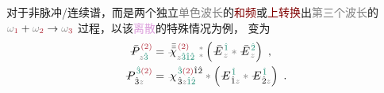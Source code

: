 对于\textcolor{NavyBlue}{非脉冲}/\textcolor{NavyBlue}{连续谱}，而是两个独立\textcolor{gray}{单色波长}的\textcolor{Maroon}{和频}或\textcolor{Maroon}{上转换}出\textcolor{gray}{第三个波长}的 $\mathcolor{gray}{\omega}_{\textcolor{Maroon}{1}} + \mathcolor{gray}{\omega}_{\textcolor{Maroon}{2}} \to \mathcolor{gray}{\omega}_{\textcolor{Maroon}{3}}$ 过程，以该\textcolor{Plum}{离散}的特殊情况为例， 变为
\begin{subequations} \label{eq:DP^(2)-plane_wave_basis-3_12}
\begin{align}
	\Xint{\mathcolor{gray}{-}}{30}{\bar{P}}^{\;\! \textcolor{Maroon}{(2)} }_{\;\! \mathcolor{gray}{z} \textcolor{PineGreen}{\hat{3}}} &= \Xint{{}^{}_{\mathcolor{gray}{-}}}{23}{\bar{\bar{\bar{\chi}}}}^{\;\!  \textcolor{Maroon}{(2)}}_{\mathcolor{gray}{z} \textcolor{PineGreen}{\hat{3} \hat{1} \hat{2}} } ~{}^{\mathcolor{gray}{*}}_{\mathcolor{gray}{*}} \left( \Xint{\mathcolor{gray}{-}}{295}{\bar{E}}^{\;\! \textcolor{PineGreen}{\hat{1}} }_{\;\! \mathcolor{gray}{z} } \mathcolor{gray}{*} \Xint{\mathcolor{gray}{-}}{295}{\bar{E}}^{\;\! \textcolor{PineGreen}{\hat{2}} }_{\;\! \mathcolor{gray}{z} } \right) ~, \label{eq:vec-DP^(2)-plane_wave_basis-3_12} \\
	\Xint{\mathcolor{gray}{-}}{30}{P}^{\;\! \textcolor{PineGreen}{\hat{3}} \textcolor{Maroon}{(2)} }_{\;\! \hat{3}\mathcolor{gray}{z}} &= \Xint{{}^{}_{\mathcolor{gray}{-}}}{23}{\chi}^{\;\! \textcolor{PineGreen}{\hat{3}} \textcolor{Maroon}{(2)} \hat{1} \hat{2} }_{\;\! \hat{3} \mathcolor{gray}{z} \textcolor{PineGreen}{\hat{1} \hat{2}}} \mathcolor{gray}{*} \left( \Xint{\mathcolor{gray}{-}}{295}{E}^{\;\!\textcolor{PineGreen}{\hat{1}}}_{\;\! \hat{1} \mathcolor{gray}{z}} \mathcolor{gray}{*} \Xint{\mathcolor{gray}{-}}{295}{E}^{\;\!\textcolor{PineGreen}{\hat{1}}}_{\;\! \hat{2} \mathcolor{gray}{z}} \right) ~. \label{eq:components-DP^(2)-plane_wave_basis-3_12}
\end{align}
\end{subequations}
